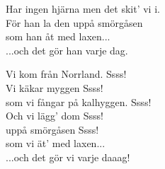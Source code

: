 Har ingen hjärna men det skit' vi i.\\
För han la den uppå smörgåsen\\
som han åt med laxen...\\
...och det gör han varje dag.\par
\vspace{10pt}
Vi kom från Norrland. Ssss!\\
Vi käkar myggen Ssss!\\
som vi fångar på kalhyggen. Ssss!\\
Och vi lägg' dom Ssss!\\
uppå smörgåsen Ssss!\\
som vi ät' med laxen...\\
...och det gör vi varje daaag!
